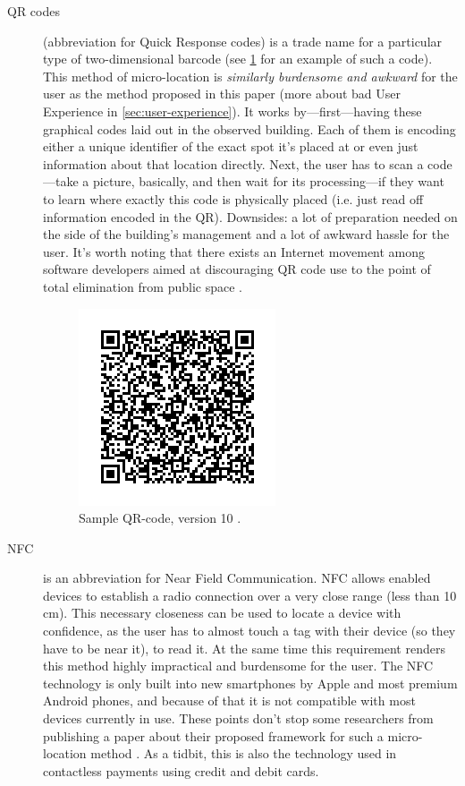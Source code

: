 \begin{description}
	\item[QR codes] (abbreviation for Quick Response codes) is a trade name for a particular type of two-dimensional barcode (see \cref{fig:qr-code} for an example of such a code). This method of micro-location is \emph{similarly burdensome and awkward} for the user as the method proposed in this paper (more about bad User Experience in \cref{sec:user-experience}). It works by---first---having these graphical codes laid out in the observed building. Each of them is encoding either a unique identifier of the exact spot it's placed at or even just information about that location directly. Next, the user has to scan a code---take a picture, basically, and then wait for its processing---if they want to learn where exactly this code is physically placed (i.e. just read off information encoded in the QR). Downsides: a lot of preparation needed on the side of the building's management and a lot of awkward hassle for the user. It's worth noting that there exists an Internet movement among software developers aimed at discouraging QR code use to the point of total elimination from public space \cite{should-i-use-qr}.
	
	\begin{figure}
		\centering
		\includegraphics{qr-code}
		\caption{Sample QR-code, version 10 \cite{wiki:qr-code}.}
		\label{fig:qr-code}
	\end{figure}
	
	\item[NFC] is an abbreviation for Near Field Communication. NFC allows enabled devices to establish a radio connection over a very close range (less than 10 cm). This necessary closeness can be used to locate a device with confidence, as the user has to almost touch a tag with their device (so they have to be near it), to read it. At the same time this requirement renders this method highly impractical and burdensome for the user. The NFC technology is only built into new smartphones by Apple and most premium Android phones, and because of that it is not compatible with most devices currently in use. These points don't stop some researchers from publishing a paper about their proposed framework for such a micro-location method \cite{nfc-ulocation}. As a tidbit, this is also the technology used in contactless payments using credit and debit cards.
	
\end{description}

